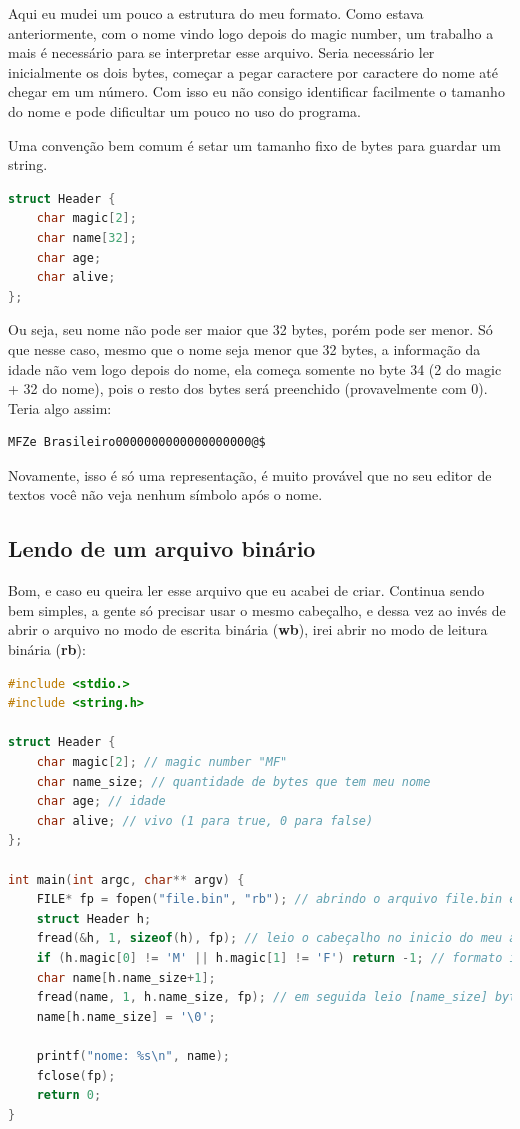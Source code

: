 \documentclass[a4paper,oneside,12pt]{article}
\begin{document}
Aqui eu mudei um pouco a estrutura do meu formato. Como estava anteriormente, com o nome vindo logo depois do magic number, um trabalho a mais é necessário para se interpretar esse arquivo. Seria necessário ler inicialmente os dois bytes, começar a pegar caractere por caractere do nome até chegar em um número. Com isso eu não consigo identificar facilmente o tamanho do nome e pode dificultar um pouco no uso do programa.

Uma convenção bem comum é setar um tamanho fixo de bytes para guardar um string.

\begin{lstlisting}[language=C, caption=Cabeçalho com tamanho fixo de string]
struct Header {
    char magic[2];
    char name[32];
    char age;
    char alive;
};
\end{lstlisting}

Ou seja, seu nome não pode ser maior que 32 bytes, porém pode ser menor. Só que nesse caso, mesmo que o nome seja menor que 32 bytes, a informação da idade não vem logo depois do nome, ela começa somente no byte 34 (2 do magic + 32 do nome), pois o resto dos bytes será preenchido (provavelmente com 0). Teria algo assim:

\begin{lstlisting}
MFZe Brasileiro0000000000000000000@$
\end{lstlisting}

Novamente, isso é só uma representação, é muito provável que no seu editor de textos você não veja nenhum símbolo após o nome.

\subsection{Lendo de um arquivo binário}

Bom, e caso eu queira ler esse arquivo que eu acabei de criar. Continua sendo bem simples, a gente só precisar usar o mesmo cabeçalho, e dessa vez ao invés de abrir o arquivo no modo de escrita binária (\textbf{wb}), irei abrir no modo de leitura binária (\textbf{rb}):

\begin{lstlisting}[language=C, caption=Exemplo de leitura em C]
#include <stdio.>
#include <string.h>

struct Header {
    char magic[2]; // magic number "MF"
    char name_size; // quantidade de bytes que tem meu nome
    char age; // idade
    char alive; // vivo (1 para true, 0 para false)
};

int main(int argc, char** argv) {
    FILE* fp = fopen("file.bin", "rb"); // abrindo o arquivo file.bin em modo de leitura binária
    struct Header h;
    fread(&h, 1, sizeof(h), fp); // leio o cabeçalho no inicio do meu arquivo
    if (h.magic[0] != 'M' || h.magic[1] != 'F') return -1; // formato inválido
    char name[h.name_size+1];
    fread(name, 1, h.name_size, fp); // em seguida leio [name_size] bytes, que é o tamanho do meu nome
    name[h.name_size] = '\0';

    printf("nome: %s\n", name);
    fclose(fp);
    return 0;
}
\end{lstlisting}
\end{document}
